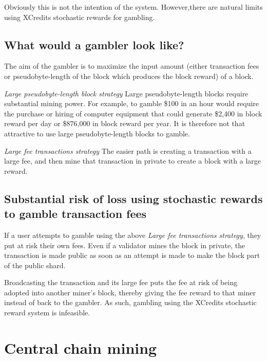 \documentclass[a4paper,12pt]{article}
\begin{document}
Obviously this is not the intention of the system. However,there are natural limits using XCredits stochastic rewards for gambling.  

\subsection{What would a gambler look like?}
The aim of the gambler is to maximize the input amount (either transaction fees or pseudobyte-length of the block which produces the block reward) of a block.  

\textit{Large pseudobyte-length block strategy}
Large pseudobyte-length blocks require substantial mining power. For example, to gamble \$100 in an hour would require the purchase or hiring of computer equipment that could generate \$2,400 in block reward per day or \$876,000 in block reward per year. It is therefore not that attractive to use large pseudobyte-length blocks to gamble. 

\textit{Large fee transactions strategy}
The easier path is creating a transaction with a large fee, and then mine that transaction in private to create a block with a large reward. 


\subsection{Substantial risk of loss using stochastic rewards to gamble transaction fees}
If a user attempts to gamble using the above \textit{Large fee transactions strategy}, they put at risk their own fees. Even if a validator mines the block in private, the transaction is made public as soon as an attempt is made to make the block part of the public shard. 

Broadcasting the transaction and its large fee puts the fee at risk of being adopted into another miner's block, thereby giving the fee reward to that miner instead of back to the gambler. As such, gambling using the XCredits stochastic reward system is infeasible.
















\section{Central chain mining}
\end{document}
